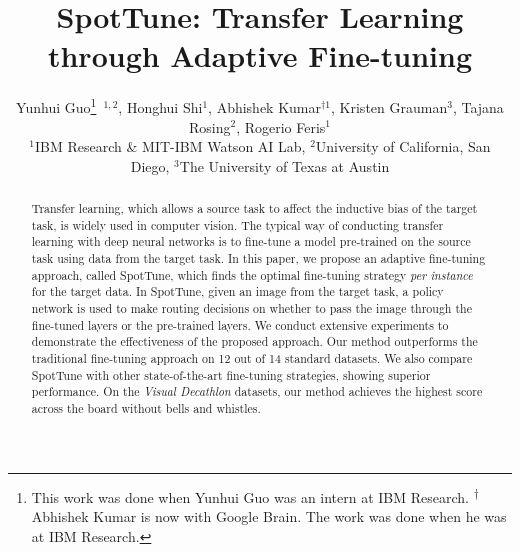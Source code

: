 \documentclass[10pt,twocolumn,letterpaper]{article}
\begin{document}
\title{SpotTune: Transfer Learning through Adaptive Fine-tuning \vspace{-0.1in}}\author{Yunhui Guo\thanks{
This work was done when Yunhui Guo was an intern at IBM Research. 
\textsuperscript{$\dag$}Abhishek Kumar is now with Google Brain. The work was done when he was at IBM Research.}~$^{1,2}$,
Honghui Shi$^{1}$, 
Abhishek Kumar$^{\dag 1}$,
Kristen Grauman$^{3}$,
Tajana Rosing$^{2}$,
Rogerio Feris$^{1}$ \vspace{0.05in} \\ 
{\normalsize $^{1}$IBM Research \& MIT-IBM Watson AI Lab},
{\normalsize $^{2}$University of California, San Diego},
{\normalsize $^{3}$The University of Texas at Austin}
}%
\begin{abstract}
Transfer learning, which allows a source task to affect the inductive bias of the target task, is widely used in computer vision. 
The typical way of conducting transfer learning with deep neural networks is to fine-tune a  model pre-trained on the source task using data from the target task. In this paper, we propose an adaptive fine-tuning approach, called SpotTune, which finds the optimal fine-tuning strategy {\em per instance} for the target data. In SpotTune, given an image from the target task, a policy network is used to make routing decisions on whether to pass the image through the fine-tuned layers or the pre-trained layers. 
We conduct extensive experiments to demonstrate the effectiveness of the proposed approach. Our method outperforms the traditional fine-tuning approach on 12 out of 14 standard datasets.
We also compare SpotTune with other state-of-the-art fine-tuning strategies, showing superior performance. On the {\em Visual Decathlon} datasets, our method achieves the highest score across the board without bells and whistles.

\vspace{-0.1in}
\end{abstract}
\end{document}
